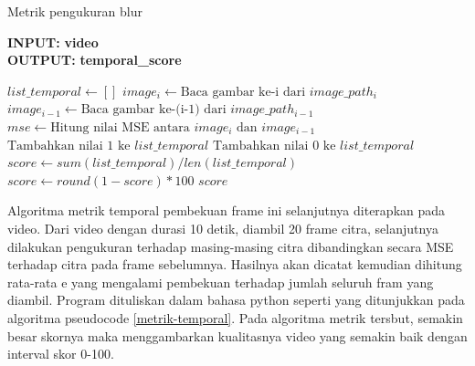 \begin{algorithm}
	\caption{Metrik pengukuran blur}
	\label{metrik-temporal}
	\begin{flushleft}
		\textbf{INPUT:} \textbf{video}\\
		\textbf{OUTPUT:}	\textbf{temporal\_score}
	\end{flushleft}
	
	\begin{algorithmic}[1]
		\State $list\_temporal \gets []$
		\State $image_i \gets \text{Baca gambar ke-i dari } image\_path_i$
		\State $image_{i-1} \gets \text{Baca gambar ke-(i-1) dari } image\_path_{i-1}$
		\State $mse \gets \text{Hitung nilai MSE antara } image_i \text{ dan } image_{i-1}$
		\State $\text{Tambahkan nilai }1 \text{ ke } list\_temporal$
		\Else
		\State $\text{Tambahkan nilai }0 \text{ ke } list\_temporal$
		\EndIf
		\EndFor
		\State $score \gets  sum(list\_temporal) / len(list\_temporal)$
		\State $score \gets  round(1 - score) * 100$
		\State \Return $score$
		\EndFunction
	\end{algorithmic}
\end{algorithm}

Algoritma metrik temporal pembekuan frame ini selanjutnya diterapkan pada video. Dari video dengan durasi 10 detik, diambil 20 frame citra, selanjutnya dilakukan pengukuran terhadap masing-masing citra dibandingkan secara MSE terhadap citra pada frame sebelumnya. Hasilnya akan dicatat kemudian dihitung rata-rata e yang mengalami pembekuan terhadap jumlah seluruh fram yang diambil. Program dituliskan dalam bahasa python seperti yang ditunjukkan pada algoritma pseudocode \ref{metrik-temporal}. Pada algoritma metrik tersbut, semakin besar skornya maka menggambarkan kualitasnya video yang semakin baik dengan interval skor 0-100.

